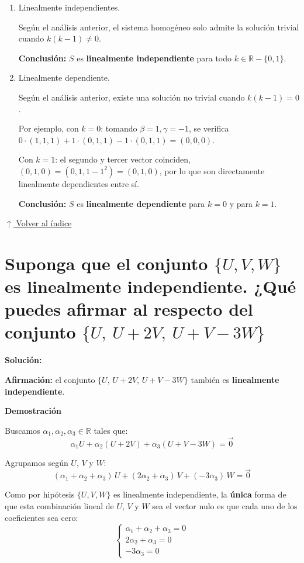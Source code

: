 \documentclass[12pt]{article}
\newcommand{\solucion}{%
    \vspace{0.8em}%
    \textbf{Solución:}%
    \vspace{0.8em}%
}
\newcommand{\volverindice}{%
    \vspace{1em}%
    \begin{flushright}%
        \hyperlink{indice}{\small $\uparrow$ Volver al índice}%
    \end{flushright}%
}
\begin{document}
\begin{enumerate}[label=\alph*.-]
    \item Linealmente independientes.

    Según el análisis anterior, el sistema homogéneo solo admite la solución trivial cuando $k(k-1)\neq0$.

    \textbf{Conclusión:} $S$ es \textbf{linealmente independiente} para todo $k \in \mathbb{R} - \{0,1\}$.

    \item Linealmente dependiente.

    Según el análisis anterior, existe una solución no trivial cuando $k(k-1)=0$.

    Por ejemplo, con $k=0$: tomando $\beta=1,\gamma=-1$, se verifica $0\cdot(1,1,1)+1\cdot(0,1,1)-1\cdot(0,1,1)=(0,0,0)$.

    Con $k=1$: el segundo y tercer vector coinciden, $(0,1,0)=(0,1,1-1^2)=(0,1,0)$, por lo que son directamente linealmente dependientes entre sí.

    \textbf{Conclusión:} $S$ es \textbf{linealmente dependiente} para $k=0$ y para $k=1$.
\end{enumerate}

\volverindice
\newpage

\section{Suponga que el conjunto $\{U,V,W\}$ es linealmente independiente. ¿Qué puedes afirmar al respecto del conjunto $\{U,\ U+2V,\ U+V-3W\}$}

\solucion

\textbf{Afirmación:} el conjunto $\{U,\, U+2V,\, U+V-3W\}$ también es \textbf{linealmente independiente}.

\textbf{Demostración}

Buscamos $\alpha_1,\alpha_2,\alpha_3 \in \mathbb{R}$ tales que:
\[
\alpha_1 U + \alpha_2(U+2V) + \alpha_3(U+V-3W) = \vec{0}
\]

Agrupamos según $U$, $V$ y $W$:
\[
(\alpha_1+\alpha_2+\alpha_3)\,U + (2\alpha_2+\alpha_3)\,V + (-3\alpha_3)\,W = \vec{0}
\]

Como por hipótesis $\{U,V,W\}$ es linealmente independiente, la \textbf{única} forma de que esta combinación lineal de $U$, $V$ y $W$ sea el vector nulo es que cada uno de los coeficientes sea cero:
\[
\begin{cases}
\alpha_1+\alpha_2+\alpha_3 = 0 \\
2\alpha_2+\alpha_3 = 0 \\
-3\alpha_3 = 0
\end{cases}
\]
\end{document}
